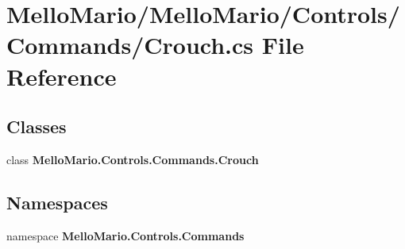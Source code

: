 \section{Mello\+Mario/\+Mello\+Mario/\+Controls/\+Commands/\+Crouch.cs File Reference}
\label{Crouch_8cs}
\subsection*{Classes}
\begin{DoxyCompactItemize}
\item 
class \textbf{ Mello\+Mario.\+Controls.\+Commands.\+Crouch}
\end{DoxyCompactItemize}
\subsection*{Namespaces}
\begin{DoxyCompactItemize}
\item 
namespace \textbf{ Mello\+Mario.\+Controls.\+Commands}
\end{DoxyCompactItemize}
